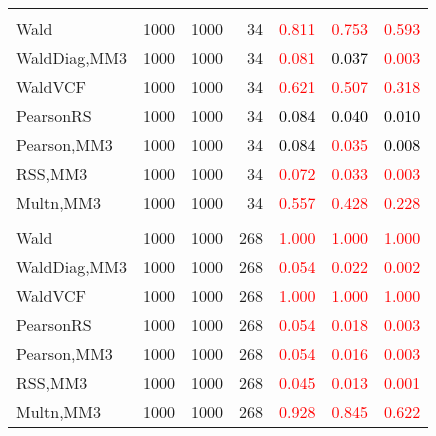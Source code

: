 \documentclass[
]{article}
\begin{document}
\begin{table}[H]
{\begin{tabular}[t]{lrrrrrr}
\addlinespace[0.3em]
\multicolumn{7}{l}{\textbf{2F 10V}}\\
\hspace{1em}Wald & 1000 & 1000 & 34 & \textcolor{red}{0.811} & \textcolor{red}{0.753} & \textcolor{red}{0.593}\\
\hspace{1em}WaldDiag,MM3 & 1000 & 1000 & 34 & \textcolor{red}{0.081} & \textcolor{black}{0.037} & \textcolor{red}{0.003}\\
\hspace{1em}WaldVCF & 1000 & 1000 & 34 & \textcolor{red}{0.621} & \textcolor{red}{0.507} & \textcolor{red}{0.318}\\
\hspace{1em}PearsonRS & 1000 & 1000 & 34 & \textcolor{black}{0.084} & \textcolor{black}{0.040} & \textcolor{black}{0.010}\\
\hspace{1em}Pearson,MM3 & 1000 & 1000 & 34 & \textcolor{black}{0.084} & \textcolor{red}{0.035} & \textcolor{black}{0.008}\\
\hspace{1em}RSS,MM3 & 1000 & 1000 & 34 & \textcolor{red}{0.072} & \textcolor{red}{0.033} & \textcolor{red}{0.003}\\
\hspace{1em}Multn,MM3 & 1000 & 1000 & 34 & \textcolor{red}{0.557} & \textcolor{red}{0.428} & \textcolor{red}{0.228}\\
\addlinespace[0.3em]
\multicolumn{7}{l}{\textbf{3F 15V}}\\
\hspace{1em}Wald & 1000 & 1000 & 268 & \textcolor{red}{1.000} & \textcolor{red}{1.000} & \textcolor{red}{1.000}\\
\hspace{1em}WaldDiag,MM3 & 1000 & 1000 & 268 & \textcolor{red}{0.054} & \textcolor{red}{0.022} & \textcolor{red}{0.002}\\
\hspace{1em}WaldVCF & 1000 & 1000 & 268 & \textcolor{red}{1.000} & \textcolor{red}{1.000} & \textcolor{red}{1.000}\\
\hspace{1em}PearsonRS & 1000 & 1000 & 268 & \textcolor{red}{0.054} & \textcolor{red}{0.018} & \textcolor{red}{0.003}\\
\hspace{1em}Pearson,MM3 & 1000 & 1000 & 268 & \textcolor{red}{0.054} & \textcolor{red}{0.016} & \textcolor{red}{0.003}\\
\hspace{1em}RSS,MM3 & 1000 & 1000 & 268 & \textcolor{red}{0.045} & \textcolor{red}{0.013} & \textcolor{red}{0.001}\\
\hspace{1em}Multn,MM3 & 1000 & 1000 & 268 & \textcolor{red}{0.928} & \textcolor{red}{0.845} & \textcolor{red}{0.622}\\
\bottomrule
\end{tabular}}
\endgroup{}
\end{table}
\end{document}
